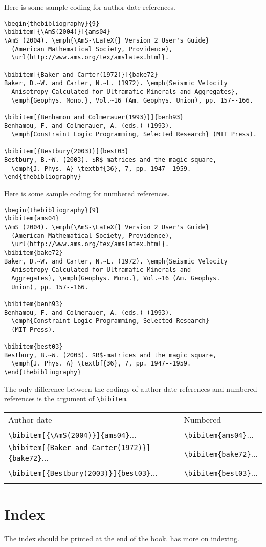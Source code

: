 Here is some sample coding for author-date references.

\begin{verbatim}
\begin{thebibliography}{9}
\bibitem[{\AmS(2004)}]{ams04}
\AmS (2004). \emph{\AmS-\LaTeX{} Version 2 User's Guide}
  (American Mathematical Society, Providence),
  \url{http://www.ams.org/tex/amslatex.html}.

\bibitem[{Baker and Carter(1972)}]{bake72}
Baker, D.~W. and Carter, N.~L. (1972). \emph{Seismic Velocity
  Anisotropy Calculated for Ultramafic Minerals and Aggregates},
  \emph{Geophys. Mono.}, Vol.~16 (Am. Geophys. Union), pp. 157--166.

\bibitem[{Benhamou and Colmerauer(1993)}]{benh93}
Benhamou, F. and Colmerauer, A. (eds.) (1993).
  \emph{Constraint Logic Programming, Selected Research} (MIT Press).

\bibitem[{Bestbury(2003)}]{best03}
Bestbury, B.~W. (2003). $R$-matrices and the magic square,
  \emph{J. Phys. A} \textbf{36}, 7, pp. 1947--1959.
\end{thebibliography}
\end{verbatim}

Here is some sample coding for numbered references.
\enlargethispage{12pt}
\begin{verbatim}
\begin{thebibliography}{9}
\bibitem{ams04}
\AmS (2004). \emph{\AmS-\LaTeX{} Version 2 User's Guide}
  (American Mathematical Society, Providence),
  \url{http://www.ams.org/tex/amslatex.html}.
\bibitem{bake72}
Baker, D.~W. and Carter, N.~L. (1972). \emph{Seismic Velocity
  Anisotropy Calculated for Ultramafic Minerals and
  Aggregates}, \emph{Geophys. Mono.}, Vol.~16 (Am. Geophys.
  Union), pp. 157--166.

\bibitem{benh93}
Benhamou, F. and Colmerauer, A. (eds.) (1993).
  \emph{Constraint Logic Programming, Selected Research}
  (MIT Press).

\bibitem{best03}
Bestbury, B.~W. (2003). $R$-matrices and the magic square,
  \emph{J. Phys. A} \textbf{36}, 7, pp. 1947--1959.
\end{thebibliography}
\end{verbatim}

The only difference between the codings of author-date references
and numbered references is the argument of \verb|\bibitem|.

{\centering
\begin{tabular}{@{}ll@{}}\toprule
Author-date & Numbered\\\colrule
\verb|\bibitem[{\AmS(2004)}]{ams04}|...&\verb|\bibitem{ams04}|...\\
\verb|\bibitem[{Baker and Carter(1972)}]{bake72}|...&\verb|\bibitem{bake72}|...\\
\verb|\bibitem[{Bestbury(2003)}]{best03}|...&\verb|\bibitem{best03}|...\\
\botrule
\end{tabular}}

\section{Index}
The index should be printed at the end of the book.  has more
on indexing.
